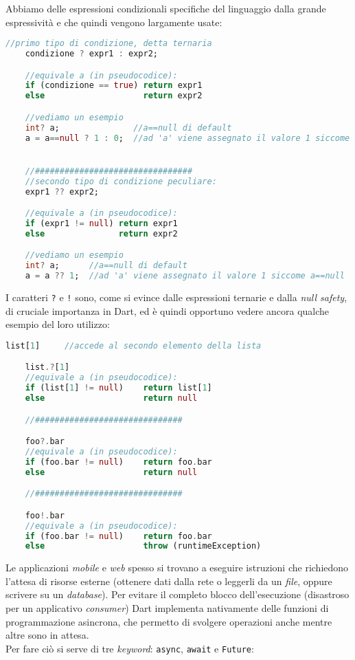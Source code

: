 Abbiamo delle espressioni condizionali specifiche del linguaggio dalla grande espressività e che quindi vengono largamente usate:

\begin{lstlisting}[language=dart, firstnumber=1,caption={Dart espressioni ternarie}]
    //primo tipo di condizione, detta ternaria
    condizione ? expr1 : expr2;

    //equivale a (in pseudocodice):
    if (condizione == true) return expr1
    else                    return expr2

    //vediamo un esempio
    int? a;               //a==null di default
    a = a==null ? 1 : 0;  //ad 'a' viene assegnato il valore 1 siccome a==null


    //################################
    //secondo tipo di condizione peculiare:
    expr1 ?? expr2;

    //equivale a (in pseudocodice):
    if (expr1 != null) return expr1
    else               return expr2

    //vediamo un esempio
    int? a;      //a==null di default
    a = a ?? 1;  //ad 'a' viene assegnato il valore 1 siccome a==null
\end{lstlisting}

I caratteri \verb+?+ e \verb+!+ sono, come si evince dalle espressioni ternarie e dalla \textit{null safety}, di cruciale importanza in Dart, ed è quindi opportuno vedere ancora qualche esempio del loro utilizzo:

\begin{lstlisting}[language=dart, firstnumber=1,caption={Dart operatori '?' e '!'}]
    list[1]     //accede al secondo elemento della lista

    list.?[1]
    //equivale a (in pseudocodice):
    if (list[1] != null)    return list[1]
    else                    return null

    //##############################

    foo?.bar 
    //equivale a (in pseudocodice):
    if (foo.bar != null)    return foo.bar
    else                    return null

    //##############################

    foo!.bar
    //equivale a (in pseudocodice):
    if (foo.bar != null)    return foo.bar
    else                    throw (runtimeException)
\end{lstlisting}

Le applicazioni \textit{mobile} e \textit{web} spesso si trovano a eseguire istruzioni che richiedono l'attesa di risorse esterne (ottenere dati dalla rete o leggerli da un \textit{file}, oppure scrivere su un \textit{database}). Per evitare il completo blocco dell'esecuzione (disastroso per un applicativo \textit{consumer}) Dart implementa nativamente delle funzioni di programmazione asincrona, che permetto di svolgere operazioni anche mentre altre sono in attesa.\\
Per fare ciò si serve di tre \textit{keyword}: \verb+async+, \verb+await+ e \verb+Future+:

